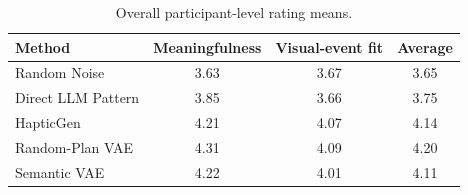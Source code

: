 \begin{table}[t]
\centering
\caption{Overall participant-level rating means.}
\label{tab:overall-ratings}
\small
\renewcommand{\arraystretch}{1.15}
\begin{tabular}{@{}lccc@{}}
\hline
\textbf{Method} & \textbf{Meaningfulness} & \textbf{Visual-event fit} & \textbf{Average} \\
\hline
Random Noise & 3.63 & 3.67 & 3.65 \\
Direct LLM Pattern & 3.85 & 3.66 & 3.75 \\
HapticGen & 4.21 & 4.07 & 4.14 \\
Random-Plan VAE & 4.31 & 4.09 & 4.20 \\
Semantic VAE & 4.22 & 4.01 & 4.11 \\
\hline
\end{tabular}
\end{table}
